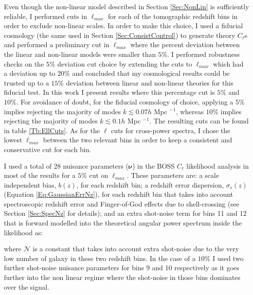 \qquad Even though the non-linear model described in Section \ref{Sec:NonLin} is sufficiently reliable, I performed cuts in $\ell_{max}$ for each of the tomographic redshift bins in order to exclude non-linear scales. In order to make this choice, I used a fiducial cosmology (the same used in Section \ref{Sec:ConsistControl}) to generate theory $C_{\ell}$s and performed a preliminary cut in $\ell_{max}$ where the percent deviation between the linear and non-linear models were smaller than $5\%$. I performed robustness checks on the $5\%$ deviation cut choice by extending the cuts to $\ell_{max}$ which had a deviation up to $20\%$ and concluded that my cosmological results could be trusted up to a $15\%$ deviation between linear and non-linear theories for this fiducial test. In this work I present results where this percentage cut is $5\%$ and $10\%$. For avoidance of doubt, for the fiducial cosmology of choice, applying a $5\%$ implies rejecting the majority of modes $k \lesssim 0.07 h$ Mpc $^{-1}$, whereas $10\%$ implies rejecting the majority of modes $k \lesssim 0.1 h$ Mpc $^{-1}$. The resulting cuts can be found in table \ref{Tb:EllCuts}. As for the $\ell$ cuts for cross-power spectra, I chose the lowest $\ell_{max}$ between the two relevant bins in order to keep a consistent and conservative cut for each bin.

\qquad I used a total of 28 nuisance parameters ($\pmb{\nu}$) in the BOSS $C_{\ell}$ likelihood analysis in most of the results for a $5\%$ cut on $\ell_{max}$. These parameters are: a scale independent bias, $b(z)$, for each redshift bin; a redshift error dispersion, $\sigma_s(z)$ (Equation \ref{Eq:GaussianErrNz}), for each redshift bin that takes into account spectroscopic redshift error and Finger-of-God effects due to shell-crossing (see Section \ref{Sec:SpecNz} for details); and an extra shot-noise term for bins 11 and 12 that is forward modelled into the theoretical angular power spectrum inside the likelihood as:

where $\mathcal{N}$ is a constant that takes into account extra shot-noise due to the very low number of galaxy in these two redshift bins. In the case of a $10\%$ I used two further shot-noise nuisance parameters for bins 9 and 10 respectively as it goes further into the non linear regime where the shot-noise in those bins dominates over the signal.

